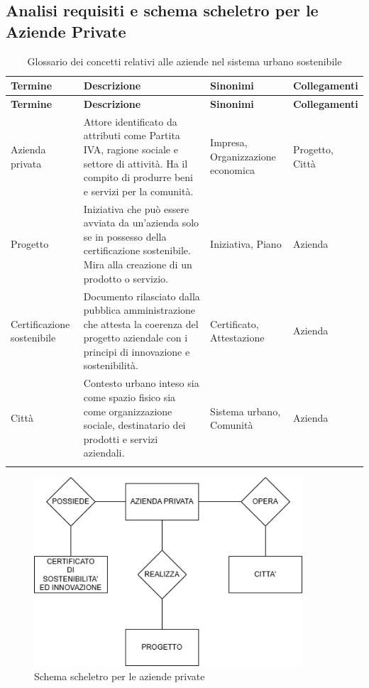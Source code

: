 \documentclass{article}
\begin{document}

\newpage
\subsection{Analisi requisiti e schema scheletro per le Aziende Private}

\begin{longtable}{|p{3cm}|p{6.5cm}|p{2.5cm}|p{3cm}|}
\hline
\textbf{Termine} & \textbf{Descrizione} & \textbf{Sinonimi} & \textbf{Collegamenti} \\
\hline
\endfirsthead

\hline
\textbf{Termine} & \textbf{Descrizione} & \textbf{Sinonimi} & \textbf{Collegamenti} \\
\hline
\endhead

Azienda privata & Attore identificato da attributi come Partita IVA, ragione sociale e settore di attività. Ha il compito di produrre beni e servizi per la comunità. & Impresa, Organizzazione economica & Progetto, Città \\
\hline

Progetto & Iniziativa che può essere avviata da un’azienda solo se in possesso della certificazione sostenibile. Mira alla creazione di un prodotto o servizio. & Iniziativa, Piano & Azienda \\
\hline

Certificazione sostenibile & Documento rilasciato dalla pubblica amministrazione che attesta la coerenza del progetto aziendale con i principi di innovazione e sostenibilità. & Certificato, Attestazione & Azienda \\
\hline

Città & Contesto urbano inteso sia come spazio fisico sia come organizzazione sociale, destinatario dei prodotti e servizi aziendali. & Sistema urbano, Comunità & Azienda \\
\hline

\caption{Glossario dei concetti relativi alle aziende nel sistema urbano sostenibile}
\label{tab:glossario-aziende}
\end{longtable}

\begin{figure}[H]
    \centering
    \includegraphics[width=10cm]{images/SCHEMA_SCHELETRO_AZIENDA.drawio.png}
    \caption{Schema scheletro per le aziende private}
    \label{fig:schema-sostenibilita}
\end{figure}
\end{document}
